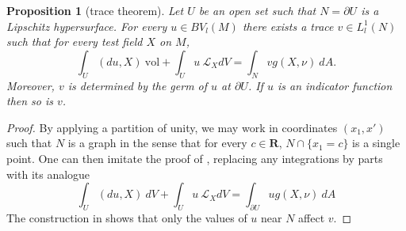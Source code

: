 \documentclass[reqno,12pt,letterpaper]{amsart}
\newcommand{\RR}{\mathbf{R}}
\newcommand{\vol}{\mathrm{vol}}
\newtheorem{proposition}[theorem]{Proposition}
\theoremstyle{definition}
\numberwithin{equation}{section}
\begin{document}
\begin{proposition}[trace theorem]\label{traces}
Let $U$ be an open set such that $N = \partial U$ is a Lipschitz hypersurface.
For every $u \in BV_l(M)$ there exists a trace $v \in L^1_l(N)$ such that for every test field $X$ on $M$,
\begin{equation}\label{Miranda IBP}
\int_U (du, X) ~\vol + \int_U u ~\mathcal L_XdV = \int_N vg(X, \nu) ~dA.
\end{equation}
Moreover, $v$ is determined by the germ of $u$ at $\partial U$.
If $u$ is an indicator function then so is $v$.
\end{proposition}
\begin{proof}
By applying a partition of unity, we may work in coordinates $(x_1, x')$ such that $N$ is a graph in the sense that for every $c \in \RR$, $N \cap \{x_1 = c\}$ is a single point.
One can then imitate the proof of \cite[Teorema 1]{Miranda67}, replacing any integrations by parts with its analogue
\begin{equation}
\label{Riemannian IBP}
\int_U (du, X) ~dV + \int_U u ~\mathcal L_XdV = \int_{\partial U} ug(X, \nu) ~dA
\end{equation}
The construction in \cite[Teorema 1]{Miranda67} shows that only the values of $u$ near $N$ affect $v$.
%
%
%
%

\end{proof}
\end{document}
